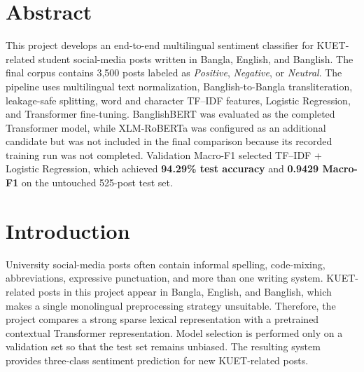 \documentclass[12pt,a4paper]{report}
\begin{document}
\clearpage
{}
\setcounter{page}{1}

\section*{Abstract}
This project develops an end-to-end multilingual sentiment classifier for
KUET-related student social-media posts written in Bangla, English, and
Banglish. The final corpus contains 3,500 posts labeled as
\textit{Positive}, \textit{Negative}, or \textit{Neutral}. The pipeline uses
multilingual text normalization, Banglish-to-Bangla transliteration,
leakage-safe splitting, word and character TF--IDF features, Logistic
Regression, and Transformer fine-tuning. BanglishBERT was evaluated as the
completed Transformer model, while XLM-RoBERTa was configured as an
additional candidate but was not included in the final comparison because
its recorded training run was not completed. Validation Macro-F1 selected
TF--IDF + Logistic Regression, which achieved \textbf{94.29\% test accuracy}
and \textbf{0.9429 Macro-F1} on the untouched 525-post test set.

\section{Introduction}
University social-media posts often contain informal spelling, code-mixing,
abbreviations, expressive punctuation, and more than one writing system.
KUET-related posts in this project appear in Bangla, English, and Banglish,
which makes a single monolingual preprocessing strategy unsuitable.
Therefore, the project compares a strong sparse lexical representation with
a pretrained contextual Transformer representation. Model selection is
performed only on a validation set so that the test set remains unbiased.
The resulting system provides three-class sentiment prediction for new
KUET-related posts.

\end{document}
